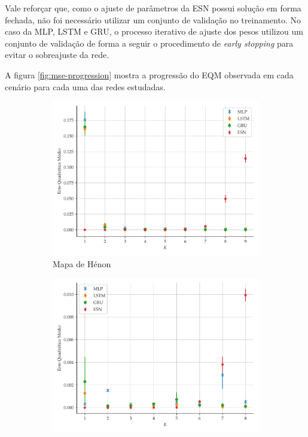 \documentclass[a4paper, 12pt]{article}
\begin{document}
Vale reforçar que, como o ajuste de parâmetros da ESN possui solução em forma fechada, não foi necessário utilizar um conjunto de validação no treinamento. No caso da MLP, LSTM e GRU, o processo iterativo de ajuste dos pesos utilizou um conjunto de validação de forma a seguir o procedimento de \textit{early stopping} para evitar o sobreajuste da rede.

A figura \ref{fig:mse-progression} mostra a progressão do EQM observada em cada cenário para cada uma das redes estudadas. 
\begin{figure}[!ht]
     \begin{subfigure}[t]{0.45\textwidth} 
         \includegraphics[scale=0.4]{progressao-k-henon.pdf}
         \caption{Mapa de Hénon}
     \end{subfigure}
     \centering
     \begin{subfigure}[t]{0.45\textwidth} 
         \includegraphics[scale=0.4]{progressao-k-logistic.pdf}

\end{subfigure}
\end{figure}
\end{document}
